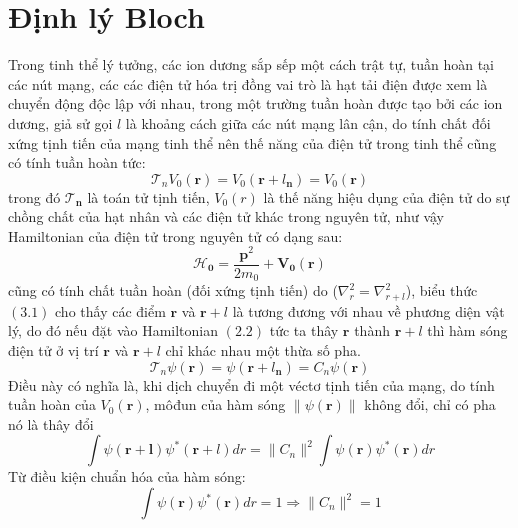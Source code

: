 \section{Định lý Bloch}
Trong tinh thể lý tưởng, các ion dương sắp sếp một cách trật tự, tuần hoàn tại các nút mạng, các các điện tử hóa trị đồng vai trò là hạt tải điện được xem là chuyển động độc lập với nhau, trong một trường tuần hoàn được tạo bởi các ion dương, giả sử gọi $\mathit{l}$ là khoảng cách giữa các nút mạng lân cận, do tính chất đối xứng tịnh tiến của mạng tinh thể nên thế năng của điện tử trong tinh thể cũng có tính tuần hoàn tức:
\begin{equation}
\mathcal{T}_n V_0\left(\mathbf{r}\right) = V_0\left(\mathbf{r+\mathit{l}_n}\right) = V_0\left(\mathbf{r}\right)
\end{equation}
trong đó $\mathbf{\mathcal{T}_n}$ là toán tử tịnh tiến, $V_0\left(r\right)$ là thế năng hiệu dụng của điện tử do sự chồng chất của hạt nhân và các điện tử khác trong nguyên tử, như vậy Hamiltonian của điện tử trong nguyên tử có dạng sau:
\begin{equation}
\mathbf{\mathcal{H}_0} = \frac{\mathbf{p}^2}{2m_0} + \mathbf{V_0\left(\mathbf{r}\right)}
\end{equation}
cũng có tính chất tuần hoàn (đối xứng tịnh tiến) do ($\nabla_{r}^2 = \nabla_{r+l}^2$), biểu thức $(3.1)$ cho thấy các điểm $\mathbf{r}$ và $\mathbf{r+\mathit{l}}$ là tương đương với nhau về phương diện vật lý, do đó nếu đặt vào Hamiltonian $(2.2)$ tức ta thây $\mathbf{r}$ thành $\mathbf{r+\mathit{l}}$ thì hàm sóng điện tử ở vị trí $\mathbf{r}$  và $\mathbf{r+\mathit{l}}$ chỉ khác nhau một thừa số pha.
\begin{equation}
\mathcal{T}_n\psi\left(\mathbf{r}\right) = \psi\left(\mathbf{r+\mathit{l}_n}\right) = C_n\psi\left(\mathbf{r}\right)
\end{equation}
 Điều này có nghĩa là, khi dịch chuyển đi một véctơ tịnh tiến của mạng, do tính tuần hoàn của $V_0\left(\mathbf{r}\right)$, môđun của hàm sóng $\|\psi\left(\mathbf{r}\right)\|$ không đổi, chỉ có pha nó là thây đổi
 \begin{equation}
 \int\psi\left(\mathbf{r+l}\right)\psi^*\left(\mathbf{r+\mathit{l}}\right)dr = \|C_n\|^2  \int\psi\left(\mathbf{r}\right)\psi^*\left(\mathbf{r}\right)dr
 \end{equation}
Từ điều kiện chuẩn hóa của hàm sóng:
\begin{equation}
\int\psi\left(\mathbf{r}\right)\psi^*\left(\mathbf{r}\right)dr = 1     \Longrightarrow \|C_n\|^2 = 1
\end{equation}
